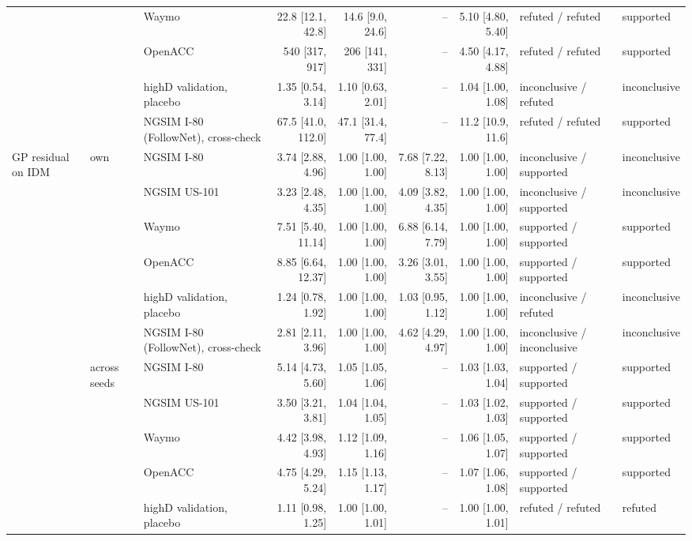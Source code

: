 \begin{longtable}{lllrrrrll}
 &  & Waymo & 22.8 [12.1, 42.8] & 14.6 [9.0, 24.6] & -- & 5.10 [4.80, 5.40] & refuted / refuted & supported \\
 &  & OpenACC & 540 [317, 917] & 206 [141, 331] & -- & 4.50 [4.17, 4.88] & refuted / refuted & supported \\
 &  & highD validation, placebo & 1.35 [0.54, 3.14] & 1.10 [0.63, 2.01] & -- & 1.04 [1.00, 1.08] & inconclusive / refuted & inconclusive \\
 &  & NGSIM I-80 (FollowNet), cross-check & 67.5 [41.0, 112.0] & 47.1 [31.4, 77.4] & -- & 11.2 [10.9, 11.6] & refuted / refuted & supported \\
\midrule
GP residual on IDM & own & NGSIM I-80 & 3.74 [2.88, 4.96] & 1.00 [1.00, 1.00] & 7.68 [7.22, 8.13] & 1.00 [1.00, 1.00] & inconclusive / supported & inconclusive \\
 &  & NGSIM US-101 & 3.23 [2.48, 4.35] & 1.00 [1.00, 1.00] & 4.09 [3.82, 4.35] & 1.00 [1.00, 1.00] & inconclusive / supported & inconclusive \\
 &  & Waymo & 7.51 [5.40, 11.14] & 1.00 [1.00, 1.00] & 6.88 [6.14, 7.79] & 1.00 [1.00, 1.00] & supported / supported & supported \\
 &  & OpenACC & 8.85 [6.64, 12.37] & 1.00 [1.00, 1.00] & 3.26 [3.01, 3.55] & 1.00 [1.00, 1.00] & supported / supported & supported \\
 &  & highD validation, placebo & 1.24 [0.78, 1.92] & 1.00 [1.00, 1.00] & 1.03 [0.95, 1.12] & 1.00 [1.00, 1.00] & inconclusive / refuted & inconclusive \\
 &  & NGSIM I-80 (FollowNet), cross-check & 2.81 [2.11, 3.96] & 1.00 [1.00, 1.00] & 4.62 [4.29, 4.97] & 1.00 [1.00, 1.00] & inconclusive / inconclusive & inconclusive \\
\midrule
 & across seeds & NGSIM I-80 & 5.14 [4.73, 5.60] & 1.05 [1.05, 1.06] & -- & 1.03 [1.03, 1.04] & supported / supported & supported \\
 &  & NGSIM US-101 & 3.50 [3.21, 3.81] & 1.04 [1.04, 1.05] & -- & 1.03 [1.02, 1.03] & supported / supported & supported \\
 &  & Waymo & 4.42 [3.98, 4.93] & 1.12 [1.09, 1.16] & -- & 1.06 [1.05, 1.07] & supported / supported & supported \\
 &  & OpenACC & 4.75 [4.29, 5.24] & 1.15 [1.13, 1.17] & -- & 1.07 [1.06, 1.08] & supported / supported & supported \\
 &  & highD validation, placebo & 1.11 [0.98, 1.25] & 1.00 [1.00, 1.01] & -- & 1.00 [1.00, 1.01] & refuted / refuted & refuted \\

\end{longtable}
